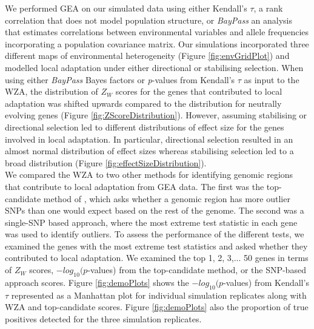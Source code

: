\documentclass[10pt,twoside,lineno]{GSA_format}
\begin{document}
We performed GEA on our simulated data using either Kendall's $\tau$, a rank correlation that does not model population structure, or \textit{BayPass} an analysis that estimates correlations between environmental variables and allele frequencies incorporating a population covariance matrix. Our simulations incorporated three different maps of environmental heterogeneity (Figure \ref{fig:envGridPlot}) and modelled local adaptation under either directional or stabilising selection. When using either \textit{BayPass} Bayes factors or \textit{p}-values from Kendall's $\tau$ as input to the WZA, the distribution of $Z_W$ scores for the genes that contributed to local adaptation was shifted upwards compared to the distribution for neutrally evolving genes (Figure \ref{fig:ZScoreDistribution}). However, assuming stabilising or directional selection led to different distributions of effect size for the genes involved in local adaptation. In particular, directional selection resulted in an almost normal distribution of effect sizes whereas stabilising selection led to a broad distribution (Figure \ref{fig:effectSizeDistribution}).\\

We compared the WZA to two other methods for identifying genomic regions that contribute to local adaptation from GEA data. The first was the top-candidate method of \cite{Yeaman2016}, which asks whether a genomic region has more outlier SNPs than one would expect based on the rest of the genome. The second was a single-SNP based approach, where the most extreme test statistic in each gene was used to identify outliers. To assess the performance of the different tests, we examined the genes with the most extreme test statistics and asked whether they contributed to local adaptation. We examined the top 1, 2, 3,... 50 genes in terms of $Z_W$ scores, $-log_{10}(p$-values) from the top-candidate method, or the SNP-based approach scores. Figure \ref{fig:demoPlots} shows the $-log_{10}(p$-values) from Kendall's $\tau$ represented as a Manhattan plot for individual simulation replicates along with WZA and top-candidate scores. Figure \ref{fig:demoPlots} also the proportion of true positives detected for the three simulation replicates. \\
\end{document}
